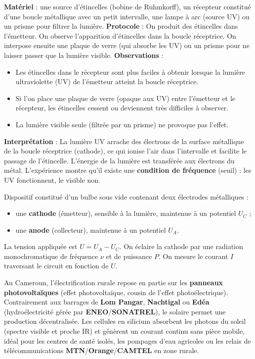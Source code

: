 \documentclass[11pt]{article}
\begin{document}
\begin{experience}
\textbf{Matériel} : une source d'étincelles (bobine de Ruhmkorff), un récepteur constitué d'une boucle métallique avec un petit intervalle, une lampe à arc (source UV) ou un prisme pour filtrer la lumière.
\textbf{Protocole} : On produit des étincelles dans l'émetteur. On observe l'apparition d'étincelles dans la boucle réceptrice. On interpose ensuite une plaque de verre (qui absorbe les UV) ou un prisme pour ne laisser passer que la lumière visible.
\textbf{Observations} :
\begin{itemize}
\item Les étincelles dans le récepteur sont plus faciles à obtenir lorsque la lumière ultraviolette (UV) de l'émetteur atteint la boucle réceptrice.
\item Si l'on place une plaque de verre (opaque aux UV) entre l'émetteur et le récepteur, les étincelles cessent ou deviennent très difficiles à observer.
\item La lumière visible seule (filtrée par un prisme) ne provoque pas l'effet.
\end{itemize}
\textbf{Interprétation} : La lumière UV arrache des électrons de la surface métallique de la boucle réceptrice (cathode), ce qui ionise l'air dans l'intervalle et facilite le passage de l'étincelle. L'énergie de la lumière est transférée aux électrons du métal. L'expérience montre qu'il existe une \textbf{condition de fréquence} (seuil) : les UV fonctionnent, le visible non.
\end{experience}

\begin{definition}
Dispositif constitué d'un bulbe sous vide contenant deux électrodes métalliques :
\begin{itemize}
\item une \textbf{cathode} (émetteur), sensible à la lumière, maintenue à un potentiel $U_C$ ;
\item une \textbf{anode} (collecteur), maintenue à un potentiel $U_A$.
\end{itemize}
La tension appliquée est $U = U_A - U_C$. On éclaire la cathode par une radiation monochromatique de fréquence $\nu$ et de puissance $P$. On mesure le courant $I$ traversant le circuit en fonction de $U$.
\end{definition}

\begin{savaistu}
Au Cameroun, l'électrification rurale repose en partie sur les \textbf{panneaux photovoltaïques} (effet photovoltaïque, cousin de l'effet photoélectrique). Contrairement aux barrages de \textbf{Lom Pangar}, \textbf{Nachtigal} ou \textbf{Edéa} (hydroélectricité gérée par \textbf{ENEO}/\textbf{SONATREL}), le solaire permet une production décentralisée. Les cellules en silicium absorbent les photons du soleil (spectre visible et proche IR) et génèrent un courant continu sans pièce mobile, idéal pour les centres de santé isolés, les pompages d'eau agricoles ou les relais de télécommunications \textbf{MTN}/\textbf{Orange}/\textbf{CAMTEL} en zone rurale.
\end{savaistu}
\end{document}

